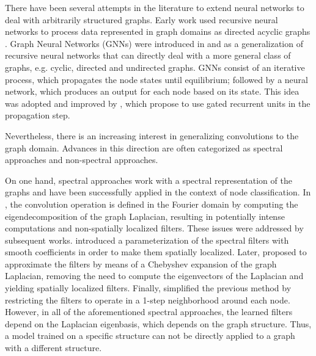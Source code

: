 \documentclass{article} %
\begin{document}
There have been several attempts in the literature to extend neural networks to deal with arbitrarily structured graphs. Early work used recursive neural networks to process data represented in graph domains as directed acyclic graphs \citep{frasconi1998general,Sperduti1997}. Graph Neural Networks (GNNs) were introduced in \cite{gori2005gnn} and \cite{scarselli2009graph} as a generalization of recursive neural networks that can directly deal with a more general class of graphs, e.g. cyclic, directed and undirected graphs. GNNs consist of an iterative process, which propagates the node states until equilibrium; followed by a neural network, which produces an output for each node based on its state. This idea was adopted and improved by \citet{li2015gated}, which propose to use gated recurrent units \citep{cho2014learning} in the propagation step.

Nevertheless, there is an increasing interest in generalizing convolutions to the graph domain. Advances in this direction are often categorized as spectral approaches and non-spectral approaches. 

On one hand, spectral approaches work with a spectral representation of the graphs and have been successfully applied in the context of node classification. In \cite{bruna2013spectral}, the convolution operation is defined in the Fourier domain by computing the eigendecomposition of the graph Laplacian, resulting in potentially intense computations and non-spatially localized filters. These issues were addressed by subsequent works. \cite{henaff2015deep} introduced a parameterization of the spectral filters with smooth coefficients in order to make them spatially localized. Later, \citet{defferrard2016convolutional} proposed to approximate the filters by means of a Chebyshev expansion of the graph Laplacian, removing the need to compute the eigenvectors of the Laplacian and yielding spatially localized filters. Finally, \cite{kipf2016semi} simplified the previous method by restricting the filters to operate in a 1-step neighborhood around each node. However, in all of the aforementioned spectral approaches, the learned filters depend on the Laplacian eigenbasis, which depends on the graph structure. Thus, a model trained on a specific structure can not be directly applied to a graph with a different structure.
\end{document}
